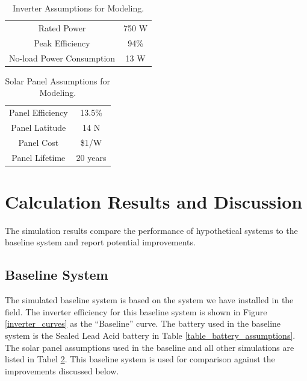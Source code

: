 \documentclass[conference]{IEEEtran}
\begin{document}
\begin{table}
\centering
\begin{tabular}{ c c }
Rated Power               & 750 W \\
Peak Efficiency           & 94\%  \\
No-load Power Consumption & 13 W  \\ 
\end{tabular}
\caption{Inverter Assumptions for Modeling.}
\label{tbl_inverter_assumptions}
\end{table}


\begin{table}
\centering
\begin{tabular}{ c c }
Panel Efficiency       & 13.5\% \\
Panel Latitude         & 14 N  \\ 
Panel Cost             & \$1/W  \\
Panel Lifetime         & 20 years \\
\end{tabular}
\caption{Solar Panel Assumptions for Modeling.}
\label{table_panel_assumptions}
\end{table}


\section{Calculation Results and Discussion}

The simulation results compare the performance of hypothetical
systems to the baseline system and report potential improvements.

\subsection{Baseline System}
The simulated baseline system is based on the system we have
installed in the field.
The inverter efficiency for this baseline system is shown in Figure
\ref{inverter_curves} as the ``Baseline'' curve.
The battery used in the baseline system is the Sealed Lead Acid
battery in Table \ref{table_battery_assumptions}.
The solar panel assumptions used in the baseline and all other
simulations are listed in Tabel \ref{table_panel_assumptions}.
This baseline system is used for comparison against the
improvements discussed below.
\end{document}
